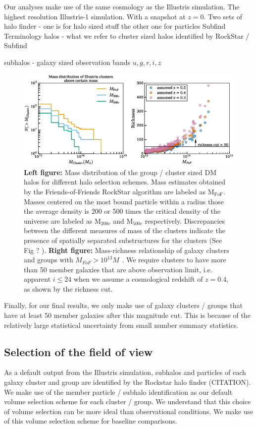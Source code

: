 \documentclass[usenatbib]{mn2e}
\begin{document}
Our analyses make use of the same cosmology as the Illustris simulation.
The highest resolution Illustris-1 simulation. 
With a snapshot at $z=0$. 
Two sets of halo finder - one is for halo sized stuff 
the other one for particles Subfind 
Terminology 
halos - what we refer to cluster sized halos identified by RockStar  / Subfind 

subhalos - galaxy sized  
observation bands $u, g, r, i, z$



\begin{figure}
	\includegraphics[width=\linewidth]{./figures/finalized/clusterMassDist.eps}
	\caption{ {\bf Left figure:} Mass distribution of the group / cluster sized DM halos
		for different halo selection schemes. Mass estimates obtained by the
		Friends-of-Friends RockStar algorithm are labeled as  M$_{\text{FoF}}$.
		Masses centered on the most bound particle within a radius those the 
		average density is 200 or 500 times the critical density of the universe are 
		labeled as M$_{200c}$ and M$_{500c}$ respectively. 
		Discrepancies between the different
		measures of mass of the clusters indicate the presence of spatially
		separated substructures for the clusters (See Fig ? ). {\bf Right figure:} Mass-richness
		relationship of galaxy clusters and groups with $M_{FoF} > 10^{13} M_{}$ . We require clusters to have more than 50 member galaxies that
	are above observation limit, i.e. apparent $i \leq 24$ when we assume a cosmological redshift
of $z=0.4$, as shown by the richness cut. \label{fig:mass_richness}}

\end{figure}

Finally, for our final results, we only make use of galaxy clusters / groups 
that have at least 50 member galaxies after this magnitude cut. This is because
of the relatively large statistical uncertainty from small number summary
statistics. 

\subsection{Selection of the field of view}
\label{sec:FOV}
As a default output from the Illustris simulation, subhalos and particles of
each galaxy cluster and group are identified by the Rockstar halo finder
(CITATION). We make use of the member particle / subhalo identification as our
default volume selection scheme for each cluster / group.
We understand that this choice of volume selection can be more ideal than
observational conditions. We make use of this volume selection scheme
for baseline comparisons. 
\end{document}
